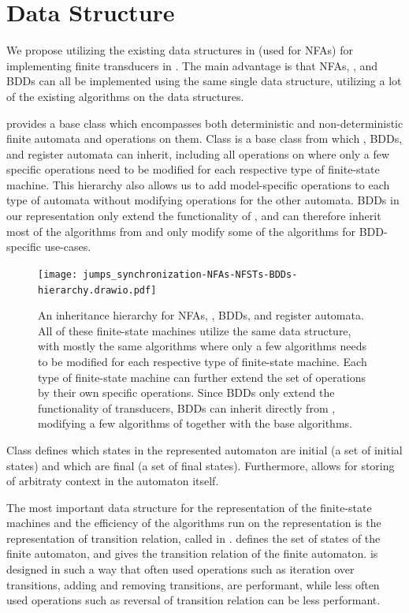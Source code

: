 \section{Data Structure}
We propose utilizing the existing data structures in \mata (used for NFAs) for implementing finite transducers in \mata.
The main advantage is that NFAs, \nfts, and BDDs can all be implemented using the same single data structure, utilizing a lot of the existing algorithms on the data structures.

\mata provides a base class \nfaClass which encompasses both deterministic and non-deterministic finite automata and operations on them.
Class \nfaClass is a base class from which \nfts, BDDs, and register automata can inherit, including all operations on \nfaClass where only a few specific operations need to be modified for each respective type of finite-state machine.
This hierarchy also allows us to add model-specific operations to each type of automata without modifying operations for the other automata.
BDDs in our representation only extend the functionality of \nfts, and can therefore inherit most of the algorithms from \nfts and only modify some of the algorithms for BDD-specific use-cases.

\begin{figure}[ht]
  \centering
  \texttt{[image: jumps\_synchronization-NFAs-NFSTs-BDDs-hierarchy.drawio.pdf]}
  \caption{
    An inheritance hierarchy for NFAs, \nfts, BDDs, and register automata.
    All of these finite-state machines utilize the same data structure, with mostly the same algorithms where only a few algorithms needs to be modified for each respective type of finite-state machine.
    Each type of finite-state machine can further extend the set of operations by their own specific operations.
    Since BDDs only extend the functionality of transducers, BDDs can inherit directly from \nfts, modifying a few algorithms of \nfts together with the base \nfaClass algorithms.
  }
\end{figure}

Class \nfaClass defines which states in the represented automaton are initial (a set of initial states) and which are final (a set of final states).
Furthermore, \nfaClass allows for storing of arbitraty context in the automaton itself.

The most important data structure for the representation of the finite-state machines and the efficiency of the algorithms run on the representation is the representation of transition relation, called \deltastruct in \mata.
\deltastruct defines the set of states of the finite automaton, and gives the transition relation of the finite automaton.
\deltastruct is designed in such a way that often used operations such as iteration over transitions, adding and removing transitions, are performant, while less often used operations such as reversal of transition relation can be less performant.

